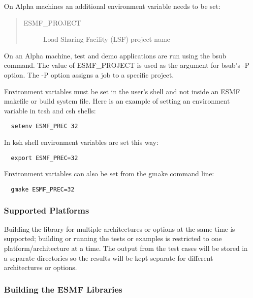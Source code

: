 On Alpha machines an additional environment variable needs
to be set:

\begin{quote}
\begin{description}
  \item[ESMF\_PROJECT] Load Sharing Facility (LSF) project name
\end{description}
\end{quote}

On an Alpha machine, test and demo applications are run using 
the bsub command.  The value of ESMF\_PROJECT is used as the 
argument for bsub's -P option. The -P option assigns a job to 
a specific project.  

Environment variables must be set in the user's shell and not
inside an ESMF makefile or build system file.  Here is an example 
of setting an environment variable in tcsh and csh shells:

\begin{verbatim}
  setenv ESMF_PREC 32
\end{verbatim}

In ksh shell environment variables are set this way:

\begin{verbatim}
  export ESMF_PREC=32
\end{verbatim}

Environment variables can also be set from the gmake command line:

\begin{verbatim}
  gmake ESMF_PREC=32
\end{verbatim}

\subsubsection{Supported Platforms}


Building the library for multiple architectures or options at the same
time is supported; building or running the tests or examples is restricted
to one platform/architecture at a time.  The output from the test cases
will be stored in a separate directories so the results will be kept 
separate for different architectures or options.

\subsubsection{Building the ESMF Libraries}
\label{BuildESMF}



